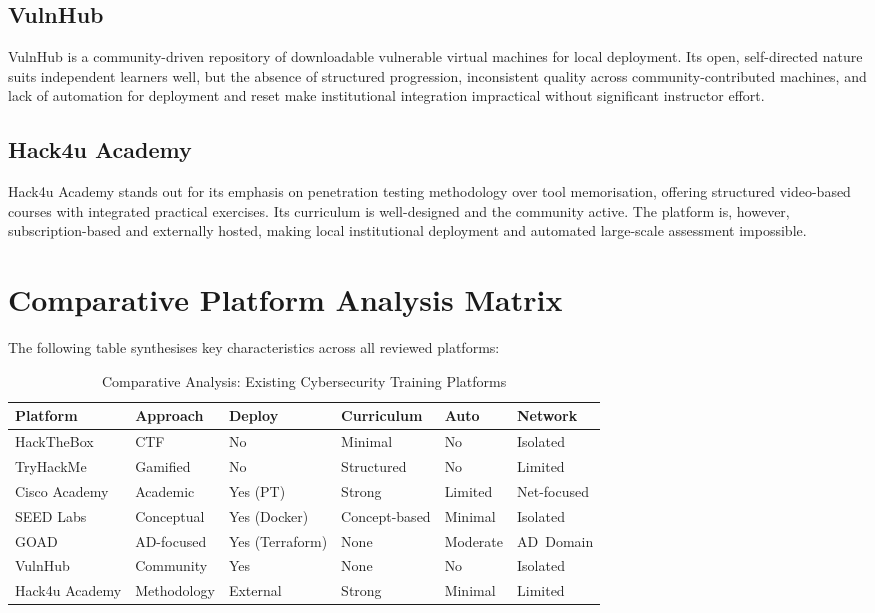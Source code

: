 \subsection{VulnHub}

VulnHub \cite{vulnhub} is a community-driven repository of downloadable vulnerable virtual machines
for local deployment. Its open, self-directed nature suits independent learners well, but the
absence of structured progression, inconsistent quality across community-contributed machines,
and lack of automation for deployment and reset make institutional integration impractical
without significant instructor effort.

\subsection{Hack4u Academy}

Hack4u Academy \cite{hack4u} stands out for its emphasis on penetration testing methodology over
tool memorisation, offering structured video-based courses with integrated practical exercises.
Its curriculum is well-designed and the community active. The platform is, however,
subscription-based and externally hosted, making local institutional deployment and automated
large-scale assessment impossible.


\section{Comparative Platform Analysis Matrix}

The following table synthesises key characteristics across all reviewed platforms:

\begin{table}[H]
\centering
\scriptsize
\setlength{\tabcolsep}{4pt}
\begin{tabularx}{\textwidth}{lXXXXX}
\toprule
\textbf{Platform} & \textbf{Approach} & \textbf{Deploy} & \textbf{Curriculum} & \textbf{Auto} & \textbf{Network} \\
\midrule
HackTheBox & CTF & No & Minimal & No & Isolated \\
TryHackMe & Gamified & No & Structured & No & Limited \\
Cisco Academy & Academic & Yes (PT) & Strong & Limited & Net-focused \\
SEED Labs & Conceptual & Yes (Docker) & Concept-based & Minimal & Isolated \\
GOAD & AD-focused & Yes (\mbox{Terraform}) & None & Moderate & \mbox{AD Domain} \\
VulnHub & Community & Yes & None & No & Isolated \\
Hack4u Academy & Methodology & External & Strong & Minimal & Limited \\
\bottomrule
\end{tabularx}
\caption{Comparative Analysis: Existing Cybersecurity Training Platforms}
\label{tab:platform_comparison}
\end{table}


